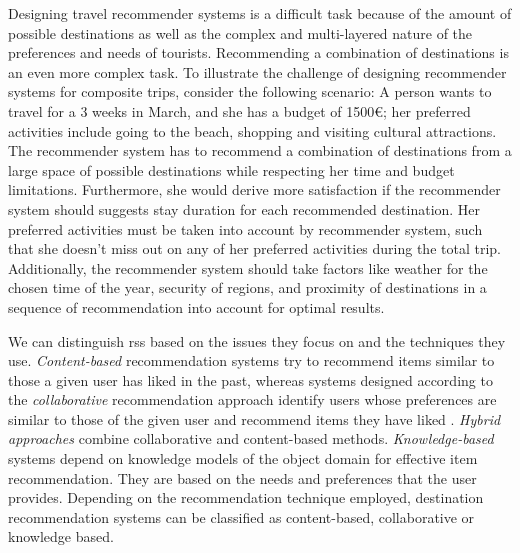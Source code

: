 Designing travel recommender systems is a difficult task because of the amount of possible destinations as well as the complex
and multi-layered nature of the preferences and needs of tourists. Recommending a combination of destinations is an even more complex task. To illustrate the challenge of designing recommender systems for composite trips, consider the following scenario: A person wants to travel for a 3 weeks in March, and she has a budget of 1500€; her preferred activities include going to the beach, shopping and visiting cultural attractions. The recommender system has to recommend a combination of destinations from a large space of possible destinations while respecting her time and budget limitations. Furthermore, she would derive more satisfaction if the recommender system should suggests stay duration for each recommended destination. Her preferred activities must be taken into account by recommender system, such that she doesn't miss out on any of her preferred activities during the total trip. Additionally, the recommender system should take factors like weather for the chosen time of the year, security of regions, and proximity of destinations in a sequence of recommendation into account for optimal results. 


We can distinguish \Glspl{rs}  based on the issues they focus on and the techniques they use.
\textit{Content-based} recommendation systems try to recommend items similar to those a given user has liked in the past, whereas systems
designed according to the \textit{collaborative} recommendation approach identify users
whose preferences are similar to those of the given user and recommend items they
have liked \parencite{Balabanovic1997Content-BasedRecommendation}. \textit{Hybrid approaches} \parencite{Adomavicius2005TowardExtensions} combine collaborative and content-based methods. \textit{Knowledge-based} systems \parencite{Burke2000Knowledge-basedSystems} depend on knowledge models of the object domain for effective item recommendation. They are based on the needs and preferences that the user provides. Depending on the recommendation technique employed, destination recommendation systems can be classified as content-based, collaborative or knowledge based.

